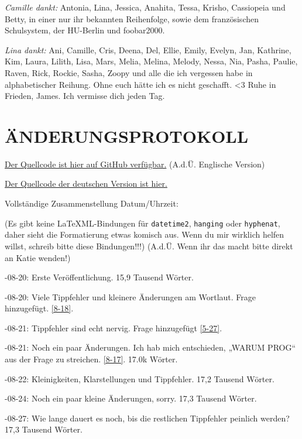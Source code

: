 \documentclass{article}
\begin{document}
{{{\textit{Camille dankt: } Antonia, Lina, Jessica, Anahita, Tessa, Krisho, Cassiopeia und Betty, in einer nur ihr bekannten Reihenfolge, sowie dem französischen Schulsystem, der HU-Berlin und foobar2000.

\textit{Lina dankt: }  Ani, Camille, Cris, Deena, Del, Ellie, Emily, Evelyn, Jan, Kathrine, Kim, Laura, Lilith, Lisa, Mars, Melia, Melina, Melody, Nessa, Nia, Pasha, Paulie, Raven, Rick, Rockie, Sasha, Zoopy und alle die ich vergessen habe in alphabetischer Reihung. Ohne euch hätte ich es nicht geschafft. <3 Ruhe in Frieden, James. Ich vermisse dich jeden Tag.


\section*{ÄNDERUNGSPROTOKOLL}

\noindent \href{https://github.com/Juicysteak117/pghrt/}{Der Quellcode ist hier auf GitHub verfügbar.} (A.d.Ü. Englische Version)

\noident \href{https://github.com/synthie-cat/pghrt-de}{Der Quellcode der deutschen Version ist hier.}

\noindent Vollständige Zusammenstellung Datum/Uhrzeit: \DTMnow

\noindent(Es gibt keine LaTeXML-Bindungen für \texttt{datetime2}, \texttt{hanging} oder \texttt{hyphenat}, daher sieht die Formatierung etwas komisch aus. Wenn du mir wirklich helfen willst, schreib bitte diese Bindungen!!!) (A.d.Ü. Wenn ihr das macht bitte direkt an Katie wenden!)

-08-20: Erste Veröffentlichung. 15,9 Tausend Wörter.

-08-20: Viele Tippfehler und kleinere Änderungen am Wortlaut. Frage hinzugefügt. \ref{8-18}.

-08-21: Tippfehler sind echt nervig. Frage hinzugefügt \ref{5-27}.

-08-21: Noch ein paar Änderungen. Ich hab mich entschieden, „WARUM PROG“ aus der Frage zu streichen. \ref{8-17}. 17.0k Wörter.

-08-22: Kleinigkeiten, Klarstellungen und Tippfehler. 17,2 Tausend Wörter.

-08-24: Noch ein paar kleine Änderungen, sorry. 17,3 Tausend Wörter.

-08-27: Wie lange dauert es noch, bis die restlichen Tippfehler peinlich werden? 17,3 Tausend Wörter.

}}}
\end{document}
